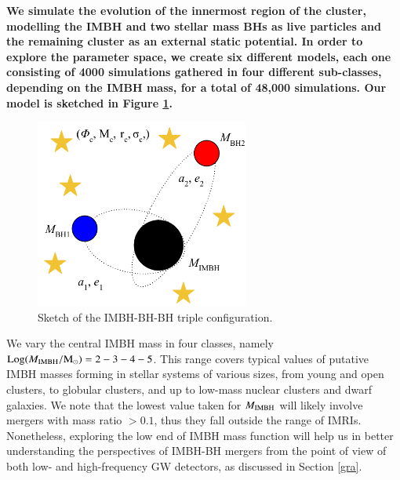 \documentclass[article]{aa}
\newcommand{\Ms}{{\rm M}_\odot}
\newcommand{\ibh}{{\rm IMBH}}
\begin{document}
{\bf
We simulate the evolution of the innermost region of the cluster, modelling the IMBH and two stellar mass BHs as live particles and
the remaining cluster as an external static potential. In order to explore the parameter space, we create six different models, each one consisting 
of 4000 simulations gathered in four different sub-classes, depending on the IMBH mass, for a total of 48,000 simulations. Our model is sketched in Figure \ref{f1}. 

\begin{figure}
    \centering
    \includegraphics[width=7cm]{triple}
    \caption{Sketch of the IMBH-BH-BH triple configuration.}    
\label{f1}
\end{figure}

We vary the central IMBH mass in four classes, namely ${\rm Log}(M_\ibh/\Ms) = 2-3-4-5$. This range covers typical values of putative IMBH masses forming in stellar systems of various sizes, from young and open clusters, to globular clusters, and up to low-mass nuclear clusters and dwarf galaxies.
We note that the lowest value taken for $M_\ibh$ will likely involve mergers with mass ratio $> 0.1$, thus they fall outside the range of IMRIs. Nonetheless, exploring the low end of IMBH mass function will help us in better understanding the perspectives of IMBH-BH mergers from the point of view of both low- and high-frequency GW detectors, as discussed in Section \ref{gra}.

}
\end{document}
